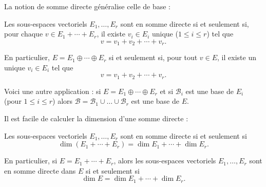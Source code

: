 \documentclass[12pt, class=report,crop=false]{standalone}
\begin{document}
La notion de somme directe généralise celle de base :
\begin{proposition}
Les sous-espaces vectoriels $E_1,\ldots,E_r$ sont en somme directe
si et seulement si, pour chaque $v \in E_1 + \cdots +E_r$, il existe $v_i \in E_i$ unique ($1\le i \le r$) tel que 
$$v = v_1+v_2+\cdots+v_r.$$
\end{proposition}
En particulier, $E = E_1 \oplus \cdots \oplus E_r$ si et seulement si, pour tout  
$v \in E$, il existe un unique $v_i \in E_i$ tel que
$$v = v_1+v_2+\cdots+v_r.$$

Voici une autre application : si $E = E_1 \oplus \cdots \oplus E_r$ et si $\mathcal{B}_i$ est une base de $E_i$ (pour $1 \le i \le r$) alors $\mathcal{B} = \mathcal{B}_1 \cup \ldots \cup \mathcal{B}_r$ est une base de $E$.

\bigskip

Il est facile de calculer la dimension d'une somme directe :
\begin{proposition}
\label{prop:dimsommedirecte}
Les sous-espaces vectoriels $E_1,\ldots,E_r$ sont en somme directe
si et seulement si
\[\dim (E_1 + \cdots +E_r) = \dim E_1 +\cdots+\dim E_r .\]
\end{proposition}
En particulier, si $E = E_1 + \cdots + E_r$, alors les sous-espaces vectoriels $E_1,\ldots,E_r$ sont en somme directe dans $E$ si et seulement si
\[\dim E  = \dim E_1 +\cdots+\dim E_r .\]
\end{document}
